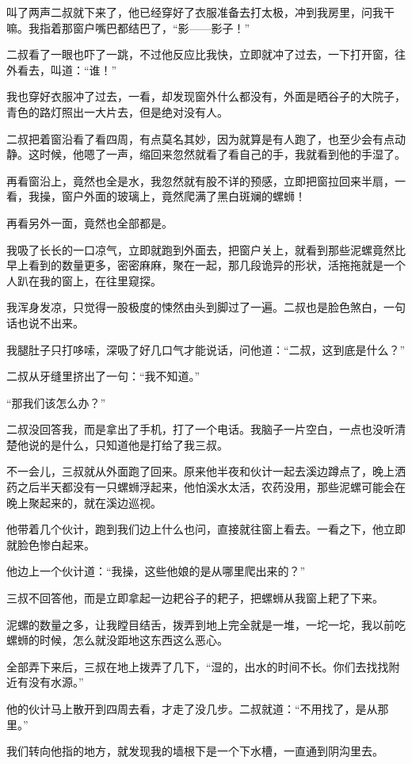 叫了两声二叔就下来了，他已经穿好了衣服准备去打太极，冲到我房里，问我干嘛。我指着那窗户嘴巴都结巴了，“影——影子！”

二叔看了一眼也吓了一跳，不过他反应比我快，立即就冲了过去，一下打开窗，往外看去，叫道：“谁！”

我也穿好衣服冲了过去，一看，却发现窗外什么都没有，外面是晒谷子的大院子，青色的路灯照出一大片去，但是绝对没有人。

二叔把着窗沿看了看四周，有点莫名其妙，因为就算是有人跑了，也至少会有点动静。这时候，他嗯了一声，缩回来忽然就看了看自己的手，我就看到他的手湿了。

再看窗沿上，竟然也全是水，我忽然就有股不详的预感，立即把窗拉回来半扇，一看，我操，窗户外面的玻璃上，竟然爬满了黑白斑斓的螺蛳！

再看另外一面，竟然也全部都是。

我吸了长长的一口凉气，立即就跑到外面去，把窗户关上，就看到那些泥螺竟然比早上看到的数量更多，密密麻麻，聚在一起，那几段诡异的形状，活拖拖就是一个人趴在我的窗上，在往里窥探。

我浑身发凉，只觉得一股极度的悚然由头到脚过了一遍。二叔也是脸色煞白，一句话也说不出来。

我腿肚子只打哆嗦，深吸了好几口气才能说话，问他道：“二叔，这到底是什么？”

二叔从牙缝里挤出了一句：“我不知道。”

“那我们该怎么办？”

二叔没回答我，而是拿出了手机，打了一个电话。我脑子一片空白，一点也没听清楚他说的是什么，只知道他是打给了我三叔。

不一会儿，三叔就从外面跑了回来。原来他半夜和伙计一起去溪边蹲点了，晚上洒药之后半天都没有一只螺蛳浮起来，他怕溪水太活，农药没用，那些泥螺可能会在晚上聚起来的，就在溪边巡视。

他带着几个伙计，跑到我们边上什么也问，直接就往窗上看去。一看之下，他立即就脸色惨白起来。

他边上一个伙计道：“我操，这些他娘的是从哪里爬出来的？”

三叔不回答他，而是立即拿起一边耙谷子的耙子，把螺蛳从我窗上耙了下来。

泥螺的数量之多，让我瞠目结舌，拨弄到地上完全就是一堆，一坨一坨，我以前吃螺蛳的时候，怎么就没距地这东西这么恶心。

全部弄下来后，三叔在地上拨弄了几下，“湿的，出水的时间不长。你们去找找附近有没有水源。”

他的伙计马上散开到四周去看，才走了没几步。二叔就道：“不用找了，是从那里。”

我们转向他指的地方，就发现我的墙根下是一个下水槽，一直通到阴沟里去。

